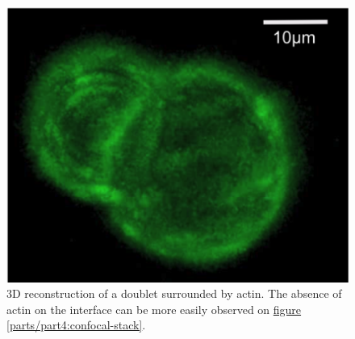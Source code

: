 \documentclass[A4paperpaper,11pt,english]{sphinxmanual}
\begin{document}
\begin{figure}[htbp]
\centering
\capstart

\includegraphics[width=0.500\linewidth]{Fig_03-A.png}
\caption{3D reconstruction of a doublet surrounded by actin. The absence of actin on
the interface can be more easily observed on \hyperref[parts/part4:confocal-stack]{figure  \ref*{parts/part4:confocal-stack}}.}\label{parts/part4:fig3a}\end{figure}
\end{document}
